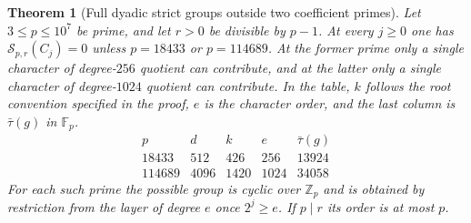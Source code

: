\documentclass[a4paper,11pt]{article}
\newtheorem{theorem}[proposition]{Theorem}
\theoremstyle{definition}
\theoremstyle{remark}
\newcommand{\ZZ}{\mathbb Z}\newcommand{\ord}{\operatorname{ord}}
\numberwithin{equation}{section}
\begin{document}
\begin{theorem}[Full dyadic strict groups outside two coefficient primes]
\leavevmode\label{thm:dyadicall525}
Let \(3\le p\le10^7\) be prime, and let \(r>0\) be divisible by
\(p-1\). At every \(j\ge0\) one has \(\mathcal S_{p,r}(C_j)=0\)
unless \(p=18433\) or \(p=114689\). At the former prime only a
single character of degree-\(256\) quotient can contribute, and at
the latter only a single character of degree-\(1024\) quotient can
contribute. In the table, \(k\) follows the root convention specified
in the proof, \(e\) is the character order, and the last column is
\(\bar\tau(g)\) in \(\mathbb F_p\).
\[
 \begin{array}{r|rrrr}
 p& d& k& e&\bar\tau(g)\\ \hline
 18433  &512 &426 &256 &13924\\
 114689 &4096&1420&1024&34058
 \end{array}
\]
For each such prime the possible group is cyclic over \(\ZZ_p\) and
is obtained by restriction from the layer of degree \(e\) once
\(2^j\ge e\). If \(p\mid r\) its order is at most \(p\).
\end{theorem}
\end{document}
